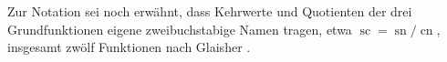 Zur Notation sei noch erwähnt, dass Kehrwerte und Quotienten der
drei Grundfunktionen eigene zweibuchstabige Namen tragen, etwa
$\operatorname{sc} = \operatorname{sn}/\operatorname{cn}$,
insgesamt zwölf Funktionen nach Glaisher
\cite[Abschnitt~11.2, Tabelle~11.3]{elliptisch:mueller-spezielle}.
%
